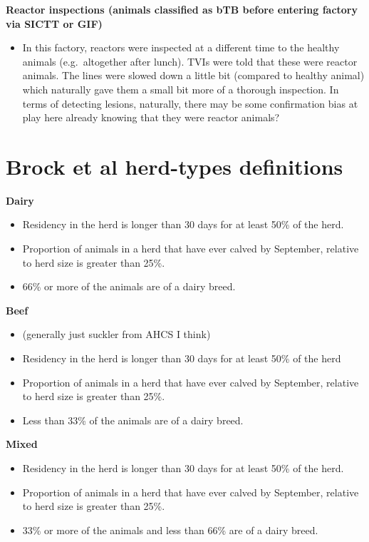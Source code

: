 \documentclass[
  letterpaper,
  DIV=11,
  numbers=noendperiod]{scrreprt}
\providecommand{\tightlist}{%
  \setlength{\itemsep}{0pt}\setlength{\parskip}{0pt}}
\begin{document}
\textbf{Reactor inspections (animals classified as bTB before entering
factory via SICTT or GIF)}

\begin{itemize}
\tightlist
\item
  In this factory, reactors were inspected at a different time to the
  healthy animals (e.g.~altogether after lunch). TVIs were told that
  these were reactor animals. The lines were slowed down a little bit
  (compared to healthy animal) which naturally gave them a small bit
  more of a thorough inspection. In terms of detecting lesions,
  naturally, there may be some confirmation bias at play here already
  knowing that they were reactor animals?
\end{itemize}

\section{Brock et al herd-types
definitions}\label{brock-et-al-herd-types-definitions}

\textbf{Dairy}

\begin{itemize}
\tightlist
\item
  Residency in the herd is longer than 30 days for at least 50\% of the
  herd.
\item
  Proportion of animals in a herd that have ever calved by September,
  relative to herd size is greater than 25\%.
\item
  66\% or more of the animals are of a dairy breed.
\end{itemize}

\textbf{Beef}

\begin{itemize}
\tightlist
\item
  (generally just suckler from AHCS I think)
\item
  Residency in the herd is longer than 30 days for at least 50\% of the
  herd
\item
  Proportion of animals in a herd that have ever calved by September,
  relative to herd size is greater than 25\%.
\item
  Less than 33\% of the animals are of a dairy breed.
\end{itemize}

\textbf{Mixed}

\begin{itemize}
\tightlist
\item
  Residency in the herd is longer than 30 days for at least 50\% of the
  herd.
\item
  Proportion of animals in a herd that have ever calved by September,
  relative to herd size is greater than 25\%.
\item
  33\% or more of the animals and less than 66\% are of a dairy breed.
\end{itemize}
\end{document}
